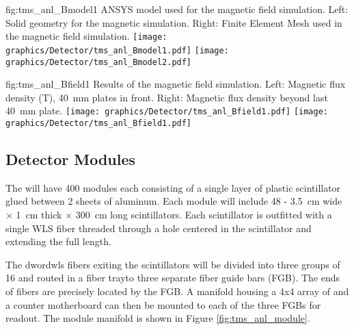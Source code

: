 \fi

\begin{dunefigure}{fig:tms_anl_Bmodel1}
{ANSYS model used for the magnetic field simulation.  Left:  Solid geometry for the magnetic simulation.  Right:  Finite Element Mesh used in the magnetic field simulation.   }
\texttt{[image: graphics/Detector/tms\_anl\_Bmodel1.pdf]} \texttt{[image: graphics/Detector/tms\_anl\_Bmodel2.pdf]}
\end{dunefigure}

\begin{dunefigure}{fig:tms_anl_Bfield1}
{Results of the magnetic field simulation.   Left:  Magnetic flux density (T), \SI{40}{\mm} plates in front.  Right:  Magnetic flux density beyond last \SI{40}{\mm}  plate. }
\texttt{[image: graphics/Detector/tms\_anl\_Bfield1.pdf]} \texttt{[image: graphics/Detector/tms\_anl\_Bfield1.pdf]}
\end{dunefigure}

\subsection{Detector Modules}
\label{sec:tms-des-panels}

The  will have \num{400} modules each consisting of a single layer of plastic scintillator glued between \num{2} sheets of aluminum.  Each module will include \num{48} - \SI{3.5}{\cm} wide $\times$ \SI{1}{\cm} thick $\times$ \SI{300}{\cm} long scintillators.  Each scintillator is outfitted with a single WLS fiber threaded through a hole centered in the scintillator and extending the full length.  

The dword{wls} fibers exiting the scintillators will be divided into three groups of \num{16} and routed in a fiber trayto three separate fiber guide bars (FGB).  The ends of  fibers are precisely located by the FGB.  A manifold housing a 4x4 array of  and a counter motherboard can then be mounted to each of the three FGBs for readout.  The module manifold is shown in Figure \ref{fig:tms_anl_module}.  


